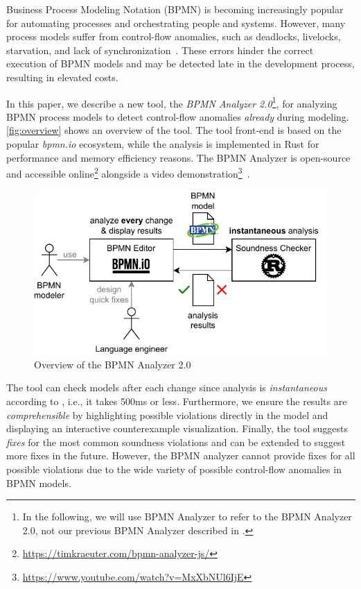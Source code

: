 \documentclass[
]{ceurart}
\begin{document}
Business Process Modeling Notation (BPMN) is becoming increasingly popular for automating processes and orchestrating people and systems.
However, many process models suffer from control-flow anomalies, such as deadlocks, livelocks, starvation, and lack of synchronization~\cite{fahlandAnalysisDemandInstantaneous2011}.
These errors hinder the correct execution of BPMN models and may be detected late in the development process, resulting in elevated costs.

In this paper, we describe a new tool, the \textit{BPMN Analyzer 2.0}\footnote{
In the following, we will use BPMN Analyzer to refer to the BPMN Analyzer 2.0, not our previous BPMN Analyzer described in \cite{krauterFormalizationAnalysisBPMN2023}.}, for analyzing BPMN process models to detect control-flow anomalies \textit{already} during modeling.
\autoref{fig:overview} shows an overview of the tool.
The tool front-end is based on the popular \textit{bpmn.io} ecosystem, while the analysis is implemented in Rust for performance and memory efficiency reasons.
The BPMN Analyzer is open-source and accessible online\footnote{\url{https://timkraeuter.com/bpmn-analyzer-js/}} alongside a video demonstration\footnote{\url{https://www.youtube.com/watch?v=MxXbNUl6IjE}}~\cite{timkrauterBPM2024Artifacts2024}.

\begin{figure}[ht]
	\centering
	\includegraphics[width=0.6\linewidth]{images/overview}
	\caption{Overview of the BPMN Analyzer 2.0}
	\label{fig:overview}
\end{figure}

The tool can check models after each change since analysis is \textit{instantaneous} according to \cite{fahlandAnalysisDemandInstantaneous2011}, i.e., it takes 500ms or less.
Furthermore, we ensure the results are \textit{comprehensible} by highlighting possible violations directly in the model and displaying an interactive counterexample visualization.
Finally, the tool suggests \textit{fixes} for the most common soundness violations and can be extended to suggest more fixes in the future.
However, the BPMN analyzer cannot provide fixes for all possible violations due to the wide variety of possible control-flow anomalies in BPMN models.
\end{document}
